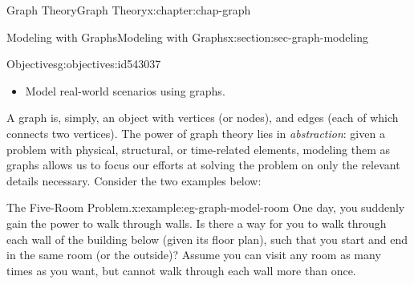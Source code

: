 \documentclass[oneside,10pt,]{book}
\numberwithin{equation}{section}
\begin{document}
\begin{chapterptx}{Graph Theory}{}{Graph Theory}{}{}{x:chapter:chap-graph}
%
%
\typeout{************************************************}
\typeout{************************************************}
%
\begin{sectionptx}{Modeling with Graphs}{}{Modeling with Graphs}{}{}{x:section:sec-graph-modeling}
\begin{objectives}{Objectives}{g:objectives:id543037}
%
\begin{itemize}[label=\textbullet]
\item{}Model real-world scenarios using graphs.%
\end{itemize}
\end{objectives}
A graph is, simply, an object with vertices (or nodes), and edges (each of which connects two vertices). The power of graph theory lies in \emph{abstraction}: given a problem with physical, structural, or time-related elements, modeling them as graphs allows us to focus our efforts at solving the problem on only the relevant details necessary. Consider the two examples below:%
\begin{example}{The Five-Room Problem.}{x:example:eg-graph-model-room}%
One day, you suddenly gain the power to walk through walls. Is there a way for you to walk through each wall of the building below (given its floor plan), such that you start and end in the same room (or the outside)? Assume you can visit any room as many times as you want, but cannot walk through each wall more than once.%
\begin{sidebyside}{1}{0.3}{0.3}{0}%
\begin{sbspanel}{0.4}%
%
\end{sbspanel}%
\end{sidebyside}%
\par

\end{example}
\end{sectionptx}
\end{chapterptx}
\end{document}

